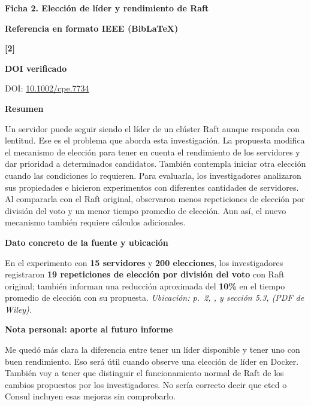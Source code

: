 \documentclass[11pt,letterpaper]{article}
\newcommand{\ficha}[2]{\begin{center}\large\bfseries Ficha #1. #2\end{center}\vspace{0.4em}}
\newcommand{\campo}[1]{\par\vspace{0.45em}\noindent\textbf{#1}\par}
\begin{document}
\clearpage
\ficha{2}{Elección de líder y rendimiento de Raft}
\campo{Referencia en formato IEEE (BibLaTeX)}
\textbf{[2]}\enspace {}
\campo{DOI verificado}
DOI: \href{https://doi.org/10.1002/cpe.7734}{10.1002/cpe.7734}
\campo{Resumen}
Un servidor puede seguir siendo el líder de un clúster Raft aunque responda con lentitud. Ese es el problema que aborda esta investigación. La propuesta modifica el mecanismo de elección para tener en cuenta el rendimiento de los servidores y dar prioridad a determinados candidatos. También contempla iniciar otra elección cuando las condiciones lo requieren. Para evaluarla, los investigadores analizaron sus propiedades e hicieron experimentos con diferentes cantidades de servidores. Al compararla con el Raft original, observaron menos repeticiones de elección por división del voto y un menor tiempo promedio de elección. Aun así, el nuevo mecanismo también requiere cálculos adicionales.
\campo{Dato concreto de la fuente y ubicación}
En el experimento con \textbf{15 servidores} y \textbf{200 elecciones}, los investigadores registraron \textbf{19 repeticiones de elección por división del voto} con Raft original; también informan una reducción aproximada del \textbf{10\%} en el tiempo promedio de elección con su propuesta. \textit{Ubicación: p.~2, \cite[p.~2]{du2023election}, y sección 5.3, \cite[pp.~13--14]{du2023election} (PDF de Wiley).}
\campo{Nota personal: aporte al futuro informe}
Me quedó más clara la diferencia entre tener un líder disponible y tener uno con buen rendimiento. Eso será útil cuando observe una elección de líder en Docker. También voy a tener que distinguir el funcionamiento normal de Raft de los cambios propuestos por los investigadores. No sería correcto decir que etcd o Consul incluyen esas mejoras sin comprobarlo.
\end{document}
